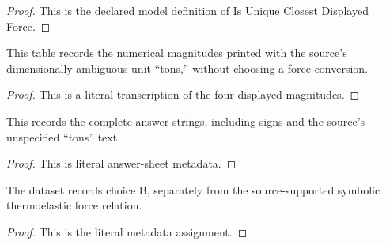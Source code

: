 \begin{proof}
  This is the declared model definition of Is Unique Closest Displayed Force.
\end{proof}
\begin{definition}
  \label{def:physics:phyx-mini-0465:phyxminiproblems-problemphyxmini0465-displayedforceinunspecifiedtons}
  This table records the numerical magnitudes printed with the source's dimensionally ambiguous unit ``tons,'' without choosing a force conversion.
\end{definition}
\begin{proof}
  This is a literal transcription of the four displayed magnitudes.
\end{proof}
\begin{definition}
  \label{def:physics:phyx-mini-0465:phyxminiproblems-problemphyxmini0465-displayedanswertext}
  This records the complete answer strings, including signs and the source's unspecified ``tons'' text.
\end{definition}
\begin{proof}
  This is literal answer-sheet metadata.
\end{proof}
\begin{definition}
  \label{def:physics:phyx-mini-0465:phyxminiproblems-problemphyxmini0465-recordedanswerchoice}
  The dataset records choice B, separately from the source-supported symbolic thermoelastic force relation.
\end{definition}
\begin{proof}
  This is the literal metadata assignment.
\end{proof}
